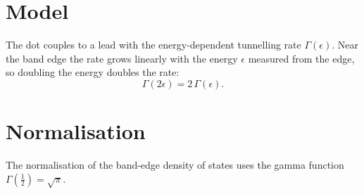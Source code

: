 \documentclass{article}
\begin{document}
\section{Model}
The dot couples to a lead with the energy-dependent tunnelling rate $\Gamma(\epsilon)$. Near the band
edge the rate grows linearly with the energy $\epsilon$ measured from the edge, so doubling the energy
doubles the rate:
\begin{equation}
\Gamma(2\epsilon) = 2\,\Gamma(\epsilon) .
\label{eq:rate}
\end{equation}
\appendix
\section{Normalisation}
The normalisation of the band-edge density of states uses the gamma function $\Gamma(\tfrac12)=\sqrt{\pi}$.
\end{document}
